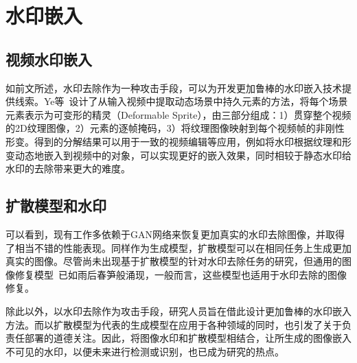 \section{水印嵌入}
\label{sec:embed}

\subsection{视频水印嵌入}

如前文所述，水印去除作为一种攻击手段，可以为开发更加鲁棒的水印嵌入技术提供线索。Ye等~\cite{ye2022deformable}设计了从输入视频中提取动态场景中持久元素的方法，将每个场景元素表示为可变形的精灵（Deformable Sprite），由三部分组成：1）贯穿整个视频的2D纹理图像，2）元素的逐帧掩码，3）将纹理图像映射到每个视频帧的非刚性形变。得到的分解结果可以用于一致的视频编辑等应用，例如将水印根据纹理和形变动态地嵌入到视频中的对象，可以实现更好的嵌入效果，同时相较于静态水印给水印的去除带来更大的难度。

\subsection{扩散模型和水印}
可以看到，现有工作多依赖于GAN网络来恢复更加真实的水印去除图像，并取得了相当不错的性能表现。同样作为生成模型，扩散模型可以在相同任务上生成更加真实的图像。尽管尚未出现基于扩散模型的针对水印去除任务的研究，但通用的图像修复模型~\cite{yildirim2023inst,rombach2022high}已如雨后春笋般涌现，一般而言，这些模型也适用于水印去除的图像修复。

除此以外，以水印去除作为攻击手段，研究人员旨在借此设计更加鲁棒的水印嵌入方法。而以扩散模型为代表的生成模型在应用于各种领域的同时，也引发了关于负责任部署的道德关注。因此，将图像水印和扩散模型相结合，让所生成的图像嵌入不可见的水印，以便未来进行检测或识别\cite{fernandez2023stable}，也已成为研究的热点。
